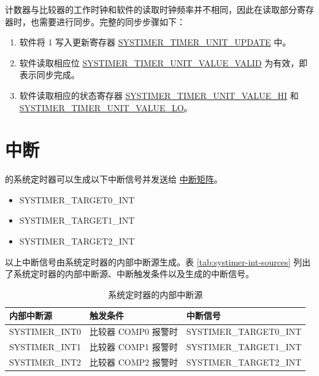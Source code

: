 \documentclass[main\_\_CN.tex]{subfiles}
\begin{document}
计数器与比较器的工作时钟和软件的读取时钟频率并不相同，因此在读取部分寄存器时，也需要进行同步。完整的同步步骤如下：
\begin{enumerate}
    \item 软件将 1 写入更新寄存器 \hyperref[fielddesc:SYSTIMERTIMERUNIT0UPDATE]{SYSTIMER\_TIMER\_UNIT\_UPDATE} 中。
    \item 软件读取相应位 \hyperref[fielddesc:SYSTIMERTIMERUNIT0VALUEVALID]{SYSTIMER\_TIMER\_UNIT\_VALUE\_VALID} 为有效，即表示同步完成。
    \item 软件读取相应的状态寄存器  \hyperref[fielddesc:SYSTIMERTIMERUNIT0VALUEHI]{SYSTIMER\_TIMER\_UNIT\_VALUE\_HI} 和 \hyperref[fielddesc:SYSTIMERTIMERUNIT0VALUELO]{SYSTIMER\_TIMER\_UNIT\_VALUE\_LO}。
\end{enumerate}


\section{中断}

\chipname{} 的系统定时器可以生成以下中断信号并发送给 \hyperref[mod:intmtrx]{中断矩阵}。

    \begin{itemize}
        \item SYSTIMER\_TARGET0\_INT
        \item SYSTIMER\_TARGET1\_INT
        \item SYSTIMER\_TARGET2\_INT
    \end{itemize}

以上中断信号由系统定时器的内部中断源生成。表 \ref{tab:systimer-int-sources} 列出了系统定时器的内部中断源、中断触发条件以及生成的中断信号。

\begin{longtable}{ | L{3cm} | L{5cm} | L{7.5cm} | }
\caption{系统定时器的内部中断源} \label{tab:systimer-int-sources}
\\ \hline
{}
\textbf{内部中断源} & \textbf{触发条件}  &  \textbf{中断信号}\\ \hline
\label{int:SYSTIMERINT0}SYSTIMER\_INT0 &
比较器 COMP0 报警时 & SYSTIMER\_TARGET0\_INT  \\ \hline
\label{int:SYSTIMERINT1}SYSTIMER\_INT1 &
比较器 COMP1 报警时 & SYSTIMER\_TARGET1\_INT  \\ \hline
\label{int:SYSTIMERINT2}SYSTIMER\_INT2 &
比较器 COMP2 报警时 & SYSTIMER\_TARGET2\_INT  \\ \hline
\end{longtable}
\end{document}
